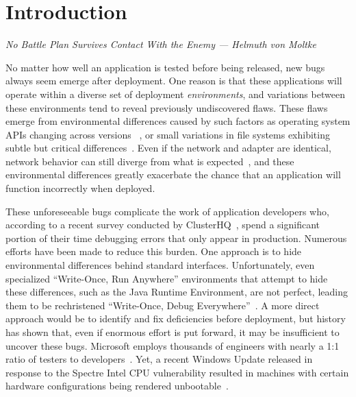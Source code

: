 \section{Introduction}
\label{SEC:introduction}
\textit{No Battle Plan Survives Contact With the Enemy --- Helmuth von Moltke}

No matter how well an application is tested before being released,
new bugs always seem emerge after deployment.
One reason is that these applications will operate within a diverse set of
deployment \emph{environments},
and variations between these environments tend to
reveal previously undiscovered flaws.
These flaws emerge from environmental differences
caused by such factors as
operating system APIs changing across versions
~\cite{LinuxGlibcChanges},
or small variations in file systems exhibiting subtle but critical
differences~\cite{EXT4Layout, AppleHFS}.
Even if the network and adapter are identical,
network behavior can still diverge from what is expected~\cite{vbox},
and these environmental differences greatly exacerbate
the chance that an application will function incorrectly when deployed.

These unforeseeable bugs
complicate the work of application developers who, according to a
recent survey conducted by ClusterHQ~\cite{ClusterHQSurvey},
spend a significant portion of their time
debugging errors that only appear in production.
Numerous efforts have been made to reduce this burden.
One approach
is to hide environmental differences behind standard interfaces.
Unfortunately,
even specialized ``Write-Once, Run Anywhere'' environments
that attempt to hide these differences,
such as the Java Runtime Environment,
are not perfect,
leading them to be rechristened ``Write-Once, Debug Everywhere''~\cite{WODE}.
A more direct approach would be
to identify and fix deficiencies before deployment,
but history has shown that,
even if enormous effort is put forward,
it may be insufficient to uncover these bugs.
Microsoft employs thousands of engineers with nearly a
1:1 ratio of testers to developers~\cite{Page2009}.
Yet, a recent Windows Update released
in response to the Spectre Intel CPU vulnerability
resulted in machines with certain hardware configurations
being rendered unbootable~\cite{kb4056892}.


